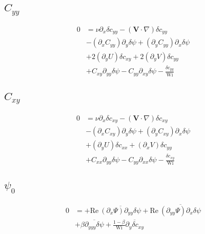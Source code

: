 \documentclass[12,a4paper]{article}
\newcommand{\dd}[1]{\partial_{#1}}
\newcommand{\scxx}{\delta c_{xx}}
\newcommand{\scyy}{\delta c_{yy}}
\newcommand{\scxy}{\delta c_{xy}}
\newcommand{\spsi}{\delta \psi}
\newcommand{\Wi}{\mathrm{Wi}}
\newcommand{\Rey}{\mathrm{Re \ }}
\begin{document}
\subsection{$C_{yy}$}

\begin{align}
    0 &= \nu \dd{x} \scyy - (\mathbf{V}\cdot \nabla) \scyy \nonumber \\
    &- (\dd{x}C_{yy})\dd{y}\spsi + (\dd{y}C_{yy})\dd{x} \spsi \nonumber\\
    &+ 2(\dd{y}U)\scxy + 2(\dd{y}V)\scyy \nonumber \\
    &+ C_{xy}\dd{yy}\spsi - C_{yy}\dd{xy} \spsi - \frac{\scyy}{\Wi} 
\end{align}

\subsection{$C_{xy}$}

\begin{align}
    0 &= \nu \dd{x} \scxy - (\mathbf{V}\cdot \nabla) \scxy \nonumber \\
    &- (\dd{x}C_{xy})\dd{y}\spsi + (\dd{y}C_{xy})\dd{x} \spsi \nonumber\\
    &+ (\dd{y}U) \scxx + (\dd{x}V) \scyy \nonumber \\
    &+ C_{xx}\dd{yy} \spsi - C_{yy} \dd{xx} \spsi - \frac{\scxy}{\Wi}
\end{align}

\subsection{$\psi_{0}$}

\begin{align}
    0 &= + \Rey\overline{(\dd{x}\Psi) \dd{yy}\spsi} + \Rey\overline{(\dd{yy}\Psi) \dd{x}\spsi } \nonumber \\
      &+ \beta \overline{\dd{yyy}\spsi} + \frac{1-\beta}{\Wi} \overline{\dd{y}\scxy}
\end{align}
\end{document}
